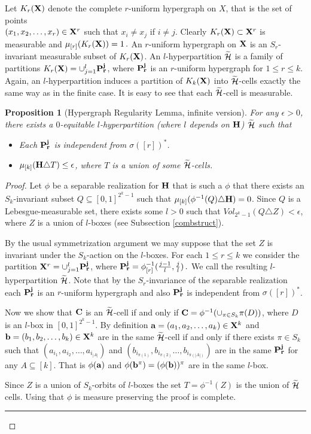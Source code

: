 \documentclass [11pt] {article}
\newcommand{\qed} {\hspace {0.1in} \rule {1.5mm} {3.5mm}}
\newtheorem{proposition}{Proposition}[section]
\def\e{\epsilon}
\def\bH{{\bf H}}
\def\cH{\mbox{$\cal H$}}
\def\xo{{\bf X}}
\def\wch{\widetilde{\cH}}
\begin{document}
\noindent Let $K_r(\xo)$ denote the complete $r$-uniform hypergraph
on $X$, that is the set of points \\ $(x_1,x_2,\dots,x_r)\in \xo^r$
such that $x_i\neq x_j$ if $i\neq j$. Clearly $K_r(\xo)\subset
\xo^r$ is measurable and $\mu_{[r]}(K_r(\xo))=1\,.$ An $r$-uniform
hypergraph on $\xo$ is an $S_r$-invariant measurable subset of
$K_r(\xo)$. An $l$-hyperpartition $\wch$ is a family of partitions
$K_r(\xo)=\cup^l_{j=1}{\bf  P^j_r}$, where ${\bf P^j_r}$ is an
$r$-uniform hypergraph for $1\leq r \leq k$. Again, an
$l$-hyperpartition induces a partition of $K_k(\xo)$ into
$\wch$-cells exactly the same way as in the finite case. It is easy
to see that each $\wch$-cell is measurable.

\begin{proposition} [Hypergraph Regularity Lemma, infinite version]
For any $\e>0$, there exists a $0$-equitable
 $l$-hyperpartition (where $l$ depends on
$\bH$) $\wch$ such that
\begin{itemize}
\item Each ${\bf P^j_r}$ is independent from $\sigma([r])^*$.
\item $\mu_{[k]}({\bf H}\triangle T)\leq \e$, where $T$ is a union of some
$\wch$-cells. \end{itemize}
\end{proposition}


\begin{proof} Let $\phi$ be a separable realization for $\bH$ that is such a
  $\phi$ that there exists an $S_k$-invariant subset
$Q\subseteq [0,1]^{2^k-1}$ such that
$\mu_{[k]}(\phi^{-1}(Q)\triangle \bH)=0$. Since $Q$ is a
Lebesgue-measurable set, there exists some $l>0$ such that
$Vol_{2^k-1}(Q\triangle Z)<\e$, where $Z$ is a union of $l$-boxes
(see Subsection \ref{combstruct}).


By the
usual symmetrization argument we may suppose that the set $Z$ is
invariant under the $S_k$-action on the $l$-boxes.
For each $1\leq r \leq k$ we consider
the partition $\xo^r=\cup_{j=1}^l{\bf  P^j_r}$, where ${\bf P^j_r}=
\phi^{-1}_{[r]}(\frac{j-1}{l}, \frac{j}{l})\,.$ We call the resulting
$l$-hyperpartition $\widetilde{\cH}$. Note that by the
$S_r$-invariance of the separable realization each ${\bf P^j_r}$ is
an $r$-uniform hypergraph and also ${\bf P^j_r}$ is
independent from $\sigma([r])^*$.


Now we show that ${\bf C}$ is an $\wch$-cell if and only if ${\bf
C}=\phi^{-1}(\cup_{\pi\in S_k} \pi(D))$, where $D$ is an $l$-box in
$[0,1]^{2^k-1}$. By definition ${\bf a}=(a_1,a_2,\dots,a_k)\in \xo^k$ and
${\bf b}=(b_1,b_2,\dots,b_k)\in \xo^k$ are in the same $\wch$-cell if and
only if there exists $\pi\in S_k$ such that
$(a_{i_1},a_{i_2},\dots, a_{i_{|A|}})$ and
$(b_{i_{\pi(1)}},b_{i_{\pi(2)}}\dots,b_{i_{\pi(|A|)}} )$ are in
the same ${\bf  P^j_r}$ for any $A\subseteq [k]$. That is $\phi({\bf a})$ and
$\phi({\bf b}^\pi)=
(\phi({\bf b}))^\pi$ are in
the same $l$-box.

\vskip 0.1in \noindent Since $Z$ is a union of $S_k$-orbits of $l$-boxes the
set $T=\phi^{-1}(Z)$
is the union of $\widetilde{\cH}$ cells. Using that $\phi$
is measure preserving the proof is complete.
\qed\end{proof}
\end{document}
